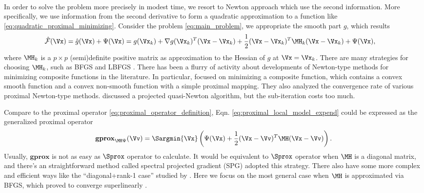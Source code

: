 \documentclass[
10pt, %
a4paper, %
oneside, %
headinclude,footinclude, %
BCOR5mm, %
]{scrartcl}
\newcommand{\Sgprox}{\mathbf{gprox}}
\begin{document}
\paragraph{}


In order to solve the problem more precisely in modest time, we resort to 
Newton approach which use the second information. More specifically, we use 
information from the second derivative to form a quadratic approximation to a 
function like \eqref{eq:quadratic_proximal_minimizing}. Consider the problem 
\eqref{eq:main_problem}, we appropriate the smooth part $g$, which results
\begin{align} \label{eq:proximal_local_model_expend}
	\hat{\mathcal{F}} (\Vx) &= \hat{g}(\Vx) + \Psi(\Vx) =  g(\Vx_k) + \nabla 
	g(\Vx_k)^T (\Vx - \Vx_k) + \frac{1}{2}(\Vx-\Vx_k)^T \MH_k (\Vx - \Vx_k) 
	+ \Psi(\Vx),
\end{align}
where $ \MH_k $ is a $p\times p$ (semi)definite positive matrix as 
approximation 
to the  Hessian of $ g$ at $\Vx=\Vx_k$. There are many strategies for choosing 
$ \MH_k $, such as BFGS and LBFGS \cite{nocedal2006numerical}. 
There has been a flurry of activity about developments of Newton-type methods 
for minimizing composite functions in the literature. In particular, 
\citet{lee2014proximal} focused on minimizing a composite function, which 
contains a convex smooth function and a convex non-smooth function with a 
simple proximal mapping. They also analyzed the convergence rate of various 
proximal Newton-type methods. 
\citet{schmidt2009optimizing,schmidt2011projected} discussed a projected 
quasi-Newton algorithm, but the sub-iteration costs too much.


Compare to the 
proximal operator \eqref{eq:proximal_operator_definition}, Eqn. 
\eqref{eq:proximal_local_model_expend} could be expressed as the generalized 
proximal operator
\begin{equation*} \label{eq:generalized_proximal_operator}
	\Sgprox_{\MH \Psi}(\Vv) = \Sargmin{\Vx}
	\left( \Psi(\Vx) + \frac{1}{2}(\Vx-\Vv)^T \MH (\Vx - \Vv) \right).
\end{equation*}
Usually, $\Sgprox$ is not as easy as $\Sprox$ operator to calculate.
It would be equivalent to $\Sprox$ operator when $ \MH $ is a diagonal matrix, 
and there's an straightforward method called spectral projected gradient (SPG) 
\cite{birgin2000nonmonotone} adopted this strategy. There also have some more 
complex and efficient ways like the ``diagonal+rank-1 case'' studied by 
\citet{becker2012quasi}. Here we focus on the most general case when $ \MH $ is 
approximated via BFGS, which proved to converge superlinearly 
\cite{lee2014proximal}.
\end{document}
